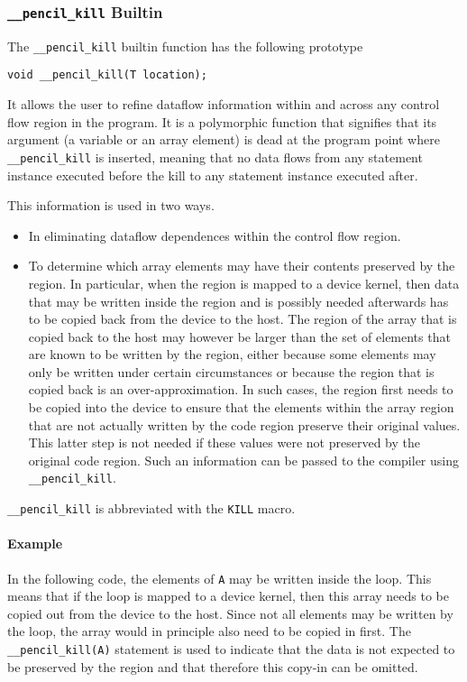 \subsubsection{\label{sec:kill}\texttt{\_\_pencil\_kill} Builtin}
  
The \lstinline!__pencil_kill! builtin function has the following prototype

  \lstinline!void __pencil_kill(T location);!

  It allows the user to refine dataflow information
  within and across any control flow region in the program.
  It is a polymorphic function that signifies that its argument
  (a variable or an array element) is dead at the program point
  where \lstinline!__pencil_kill! is inserted, meaning that no data
  flows from any statement instance executed before the kill to any
  statement instance executed after.

  This information is used in two ways.
  \begin{itemize}
   \item In eliminating dataflow dependences within the control
         flow region.
   \item To determine which array elements may have their contents
         preserved by the region.
         In particular, when the region is mapped to a device kernel, then
         data that may be written inside the region and is possibly needed
         afterwards has to be copied back from the device to the host.
         The region of the array that is copied back to the host may
         however be larger than the set of elements that are known
         to be written by the region, either because some elements
         may only be written under certain circumstances or because
         the region that is copied back is an over-approximation.
         In such cases, the region first needs to be copied into the device
         to ensure that the elements within the array region that are not
         actually written by the code region preserve their original values.
         This latter step is not needed if these values were not preserved
         by the original code region.  Such an information can be passed to
         the compiler using \lstinline!__pencil_kill!.
  \end{itemize}

  \lstinline!__pencil_kill! is abbreviated with the \lstinline!KILL! macro.

\paragraph{Example}
  In the following code, the elements of \lstinline!A!
  may be written inside the loop.  This means that if the loop
  is mapped to a device kernel, then this array needs to be copied
  out from the device to the host.  Since not all elements may be
  written by the loop, the array would in principle also need to
  be copied in first.  The \lstinline!__pencil_kill(A)! statement
  is used to indicate that the data is not expected to be preserved
  by the region and that therefore this copy-in can be omitted.

